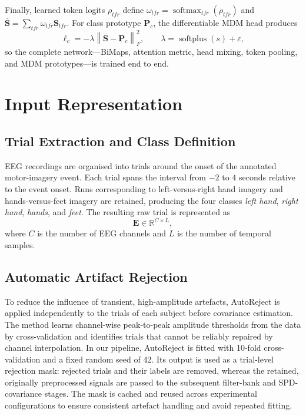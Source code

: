 Finally, learned token logits $\rho_{tfr}$ define
$\omega_{tfr}=\operatorname{softmax}_{tfr}(\rho_{tfr})$ and
$\overline{\bm S}=\sum_{tfr}\omega_{tfr}\bm S_{tfr}$.  For class prototype
$\bm P_c$, the differentiable MDM head produces
\begin{equation}
    \ell_c=-\lambda\left\|\overline{\bm S}-\bm P_c\right\|_F^2,
    \qquad \lambda=\operatorname{softplus}(s)+\varepsilon,
    \label{eq:overview-mdm}
\end{equation}
so the complete network---BiMaps, attention metric, head mixing, token pooling,
and MDM prototypes---is trained end to end.

\section{Input Representation}
\label{sec:input-representation}

\subsection{Trial Extraction and Class Definition}

EEG recordings are organised into trials around the onset of the annotated
motor-imagery event. Each trial spans the interval from $-2$ to $4$ seconds
relative to the event onset. Runs corresponding to left-versus-right hand
imagery and hands-versus-feet imagery are retained, producing the four classes
\emph{left hand}, \emph{right hand}, \emph{hands}, and \emph{feet}. The
resulting raw trial is represented as
\begin{equation}
    \bm{E} \in \mathbb{R}^{C \times L},
\end{equation}
where $C$ is the number of EEG channels and $L$ is the number of temporal
samples.

\subsection{Automatic Artifact Rejection}

To reduce the influence of transient, high-amplitude artefacts, AutoReject is
applied independently to the trials of each subject before covariance
estimation. The method learns channel-wise peak-to-peak amplitude thresholds
from the data by cross-validation and identifies trials that cannot be
reliably repaired by channel interpolation. In our pipeline, AutoReject is
fitted with 10-fold cross-validation and a fixed random seed of 42. Its output
is used as a trial-level rejection mask: rejected trials and their labels are
removed, whereas the retained, originally preprocessed signals are passed to
the subsequent filter-bank and SPD-covariance stages. The mask is cached and
reused across experimental configurations to ensure consistent artefact
handling and avoid repeated fitting.

